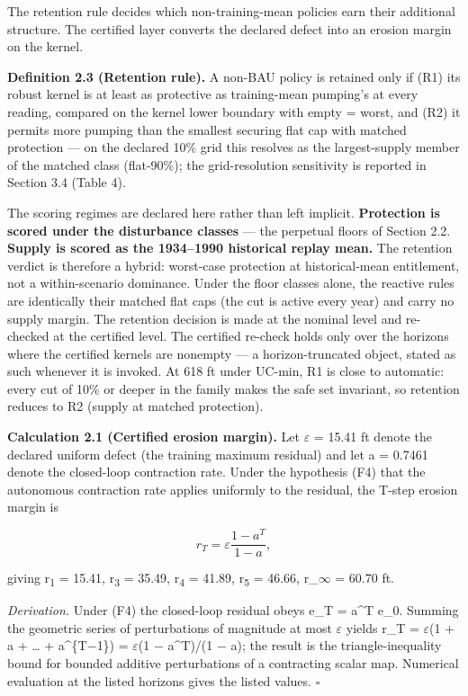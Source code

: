 The retention rule decides which non-training-mean policies earn their
additional structure. The certified layer converts the declared defect
into an erosion margin on the kernel.

\textbf{Definition 2.3 (Retention rule).} A non-BAU policy is retained
only if (R1) its robust kernel is at least as protective as
training-mean pumping's at every reading, compared on the kernel lower
boundary with empty = worst, and (R2) it permits more pumping than the
smallest securing flat cap with matched protection --- on the declared
10\% grid this resolves as the largest-supply member of the matched
class (flat-90\%); the grid-resolution sensitivity is reported in
Section 3.4 (Table 4).

The scoring regimes are declared here rather than left implicit.
\textbf{Protection is scored under the disturbance classes} --- the
perpetual floors of Section 2.2. \textbf{Supply is scored as the
1934--1990 historical replay mean.} The retention verdict is therefore a
hybrid: worst-case protection at historical-mean entitlement, not a
within-scenario dominance. Under the floor classes alone, the reactive
rules are identically their matched flat caps (the cut is active every
year) and carry no supply margin. The retention decision is made at the
nominal level and re-checked at the certified level. The certified
re-check holds only over the horizons where the certified kernels are
nonempty --- a horizon-truncated object, stated as such whenever it is
invoked. At 618 ft under UC-min, R1 is close to automatic: every cut of
10\% or deeper in the family makes the safe set invariant, so retention
reduces to R2 (supply at matched protection).

\textbf{Calculation 2.1 (Certified erosion margin).} Let \ensuremath{\varepsilon} = 15.41 ft
denote the declared uniform defect (the training maximum residual) and
let a = 0.7461 denote the closed-loop contraction rate. Under the
hypothesis (F4) that the autonomous contraction rate applies uniformly
to the residual, the T-step erosion margin is

\[r_T = \varepsilon \frac{1 - a^T}{1 - a},\]

giving r\textsubscript{1} = 15.41, r\textsubscript{3} = 35.49, r\textsubscript{4} = 41.89, r\textsubscript{5} = 46.66, r\_\ensuremath{\infty} = 60.70 ft.

\emph{Derivation.} Under (F4) the closed-loop residual obeys e\_T =
a\^{}T e\_0. Summing the geometric series of perturbations of magnitude
at most \ensuremath{\varepsilon} yields r\_T = \ensuremath{\varepsilon}(1 + a + \ldots{} + a\^{}\{T\ensuremath{-}1\}) = \ensuremath{\varepsilon}(1 \ensuremath{-}
a\^{}T)/(1 \ensuremath{-} a); the result is the triangle-inequality bound for bounded
additive perturbations of a contracting scalar map. Numerical evaluation
at the listed horizons gives the listed values. \ensuremath{\square}

